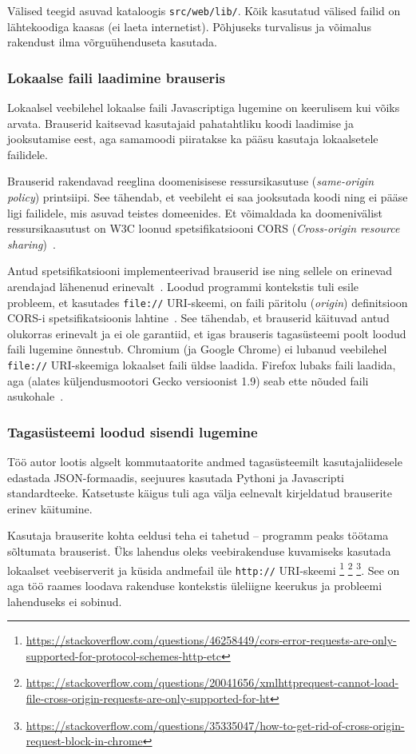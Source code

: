 \documentclass[12pt]{article}
\begin{document}
Välised teegid asuvad kataloogis \texttt{src/web/lib/}.
Kõik kasutatud välised failid on lähtekoodiga kaasas (ei laeta internetist).
Põhjuseks turvalisus ja võimalus rakendust ilma võrguühenduseta kasutada.

\subsubsection{Lokaalse faili laadimine brauseris}
Lokaalsel veebilehel lokaalse faili Javascriptiga lugemine on keerulisem kui võiks arvata.
Brauserid kaitsevad kasutajaid pahatahtliku koodi laadimise ja jooksutamise eest, aga samamoodi
piiratakse ka pääsu kasutaja lokaalsetele failidele.

Brauserid rakendavad reeglina doomenisisese ressursikasutuse (\textit{same-origin policy})
printsiipi.
See tähendab, et veebileht ei saa jooksutada koodi ning ei pääse ligi failidele, mis asuvad
teistes domeenides.
Et võimaldada ka doomenivälist ressursikaasutust on W3C loonud spetsifikatsiooni CORS
(\textit{Cross-origin resource sharing})~\cite{W3CORS}.


Antud spetsifikatsiooni implementeerivad brauserid ise ning sellele on erinevad arendajad
lähenenud erinevalt~\cite{localWebSec}.
Loodud programmi kontekstis tuli esile probleem, et kasutades \texttt{file://} URI-skeemi, on faili
päritolu (\textit{origin}) definitsioon CORS-i spetsifikatsioonis
lahtine~\cite[peatükk 4, punkt 4]{ietfOrigin}.
See tähendab, et brauserid käituvad antud olukorras erinevalt ja ei ole garantiid, et igas
brauseris tagasüsteemi poolt loodud faili lugemine õnnestub.
Chromium (ja Google Chrome) ei lubanud veebilehel \texttt{file://} URI-skeemiga lokaalset faili
üldse laadida.
Firefox lubaks faili laadida, aga (alates küljendusmootori Gecko versioonist 1.9) seab ette nõuded
faili asukohale~\cite{FFCORS}.

\subsubsection{Tagasüsteemi loodud sisendi lugemine} \label{dataInput}
Töö autor lootis algselt kommutaatorite andmed tagasüsteemilt kasutajaliidesele edastada
JSON-formaadis, seejuures kasutada Pythoni ja Javascripti standardteeke.
Katsetuste käigus tuli aga välja eelnevalt kirjeldatud brauserite erinev käitumine.

Kasutaja brauserite kohta eeldusi teha ei tahetud -- programm peaks töötama sõltumata brauserist.
Üks lahendus oleks veebirakenduse kuvamiseks kasutada lokaalset veebiserverit ja küsida andmefail
üle \texttt{http://} URI-skeemi
\footnote{\url{https://stackoverflow.com/questions/46258449/cors-error-requests-are-only-supported-for-protocol-schemes-http-etc}}
\footnote{\url{https://stackoverflow.com/questions/20041656/xmlhttprequest-cannot-load-file-cross-origin-requests-are-only-supported-for-ht}}
\footnote{\url{https://stackoverflow.com/questions/35335047/how-to-get-rid-of-cross-origin-request-block-in-chrome}}.
See on aga töö raames loodava rakenduse kontekstis üleliigne keerukus ja probleemi lahenduseks ei
sobinud.
\end{document}
